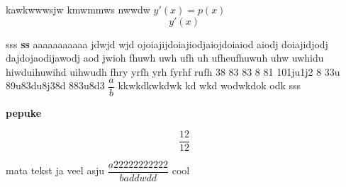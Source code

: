 \documentclass{article}
\begin{document}
kawkwwwsjw kmwmmws nwwdw $y'(x) = p(x) $ 
\[ y'(x) \] 

sss 
\textbf{ss} 
aaaaaaaaaaa jdwjd wjd ojoiajijdoiajiodjaiojdoiaiod aiodj doiajidjodj dajdojaodijawodj aod jwioh fhuwh uwh ufh uh ufheufhuwuh uhw uwhidu hiwduihuwihd uihwudh fhry yrfh yrh fyrhf rufh 38 83 83 8 81 101ju1j2 8 33u 89u83du8j38d 883u8d3 $\dfrac{a}{b} $ kkwkdkwkdwk kd wkd wodwkdok odk sss 

\textbf{pepuke} 

\[ \dfrac{12}{12} \] 

mata tekst ja veel asju $\dfrac{a22222222222}{baddwdd} $ cool 
\end{document}
